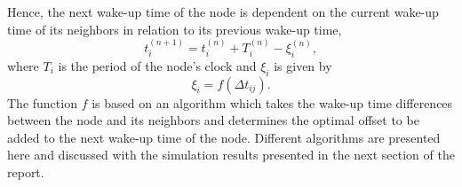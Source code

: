 \documentclass[journal]{IEEEtran}
\begin{document}
Hence, the next wake-up time of the node is
dependent on the current wake-up time of its neighbors in relation
to its previous wake-up time,
\begin{equation}
t_i^{(n+1)} = t_i^{(n)} + T_i^{(n)} - \xi_i^{(n)} ,
\end{equation}
where $T_i$ is the period of the node's clock and $\xi_i$ is given
by
\begin{equation}
\xi_i = f(\Delta t_{ij}).
\end{equation}
The function $f$ is based on an algorithm which takes the wake-up
time differences between the node and its neighbors and determines
the optimal offset to be added to the next wake-up time of the node.
\newline Different algorithms are presented here and discussed with the
simulation results presented in the next section of the report.
\end{document}
